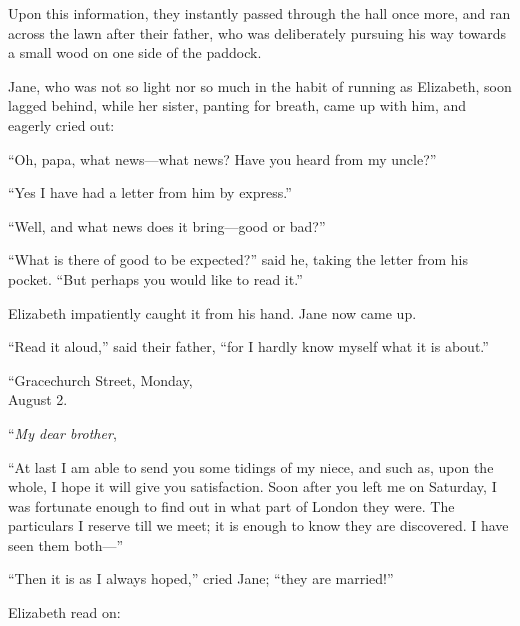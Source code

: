 Upon this information, they instantly passed through the hall
once more, and ran across the lawn after their father, who was
deliberately pursuing his way towards a small wood on one side
of the paddock.

Jane, who was not so light nor so much in the habit of running
as Elizabeth, soon lagged behind, while her sister, panting for
breath, came up with him, and eagerly cried out:

``Oh, papa, what news---what news?  Have you heard from my
uncle?''

``Yes I have had a letter from him by express.''

``Well, and what news does it bring---good or bad?''

``What is there of good to be expected?'' said he, taking the
letter from his pocket.  ``But perhaps you would like to read it.''

Elizabeth impatiently caught it from his hand.  Jane now came up.

``Read it aloud,'' said their father, ``for I hardly know myself what
it is about.''

\bigskip
``Gracechurch Street, Monday,\\
August 2.
\medskip

``\emph{My dear brother},

``At last I am able to send you some tidings of my niece, and
such as, upon the whole, I hope it will give you satisfaction.
Soon after you left me on Saturday, I was fortunate enough to
find out in what part of London they were.  The particulars I
reserve till we meet; it is enough to know they are discovered.
I have seen them both---''
\bigskip

``Then it is as I always hoped,'' cried Jane; ``they are married!''

Elizabeth read on:


